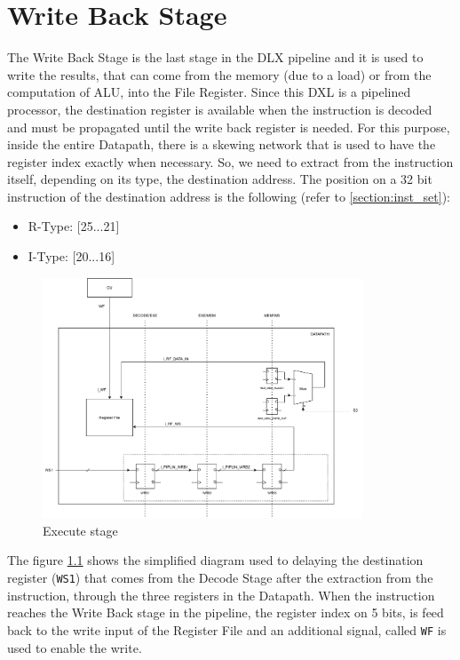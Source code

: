 \chapter{Write Back Stage}
The Write Back Stage is the last stage in the DLX pipeline and it is used to write the results, that can come from the memory (due to a load) or from the computation of ALU, into the File Register.
Since this DXL is a pipelined processor, the destination register is available when the instruction is decoded and must be propagated until the write back register is needed. For this purpose, inside the entire Datapath, there is a skewing network that is used to have the register index exactly when necessary. \newline\newline
So, we need to extract from the instruction itself, depending on its type, the destination address. The position on a 32 bit instruction of the destination address is the following (refer to \ref{section:inst_set}):
\begin{itemize}
	\itemsep0sp
	\item R-Type: [25...21]
	\item I-Type: [20...16]
\end{itemize}
\begin{figure}[H]   
	\centering
	\includegraphics[width=0.85\textwidth]{chapters/7_WriteBackStage/images/writeback.pdf}
	\caption{Execute stage}
	\label{fig:wb_stage}
\end{figure}
The figure \ref{fig:wb_stage} shows the simplified diagram used to delaying the destination register (\texttt{WS1}) that comes from the Decode Stage after the extraction from the instruction, through the three registers in the Datapath.
When the instruction reaches the Write Back stage in the pipeline, the register index on 5 bits, is feed back to the write input of the Register File and an additional signal, called \texttt{WF} is used to enable the write.\newline\newline

